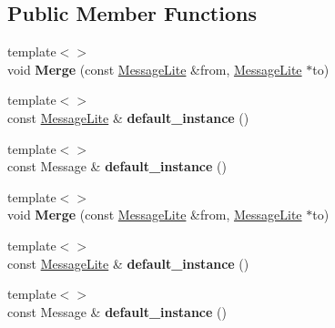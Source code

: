 \subsection*{Public Member Functions}
\begin{DoxyCompactItemize}
\item 
\mbox{\label{classgoogle_1_1protobuf_1_1internal_1_1GenericTypeHandler_a7fec9cb67f512a587f343606c2c9ef3f}} 
{\footnotesize template$<$$>$ }\\void {\bfseries Merge} (const \hyperlink{classgoogle_1_1protobuf_1_1MessageLite}{Message\+Lite} \&from, \hyperlink{classgoogle_1_1protobuf_1_1MessageLite}{Message\+Lite} $\ast$to)
\item 
\mbox{\label{classgoogle_1_1protobuf_1_1internal_1_1GenericTypeHandler_a8e5ce557f4293b60adb6891c9808e4fc}} 
{\footnotesize template$<$$>$ }\\const \hyperlink{classgoogle_1_1protobuf_1_1MessageLite}{Message\+Lite} \& {\bfseries default\+\_\+instance} ()
\item 
\mbox{\label{classgoogle_1_1protobuf_1_1internal_1_1GenericTypeHandler_ad1f6b56e0b20796321a62586f2671df4}} 
{\footnotesize template$<$$>$ }\\const Message \& {\bfseries default\+\_\+instance} ()
\item 
\mbox{\label{classgoogle_1_1protobuf_1_1internal_1_1GenericTypeHandler_a7fec9cb67f512a587f343606c2c9ef3f}} 
{\footnotesize template$<$$>$ }\\void {\bfseries Merge} (const \hyperlink{classgoogle_1_1protobuf_1_1MessageLite}{Message\+Lite} \&from, \hyperlink{classgoogle_1_1protobuf_1_1MessageLite}{Message\+Lite} $\ast$to)
\item 
\mbox{\label{classgoogle_1_1protobuf_1_1internal_1_1GenericTypeHandler_a8e5ce557f4293b60adb6891c9808e4fc}} 
{\footnotesize template$<$$>$ }\\const \hyperlink{classgoogle_1_1protobuf_1_1MessageLite}{Message\+Lite} \& {\bfseries default\+\_\+instance} ()
\item 
\mbox{\label{classgoogle_1_1protobuf_1_1internal_1_1GenericTypeHandler_ad1f6b56e0b20796321a62586f2671df4}} 
{\footnotesize template$<$$>$ }\\const Message \& {\bfseries default\+\_\+instance} ()
\end{DoxyCompactItemize}
